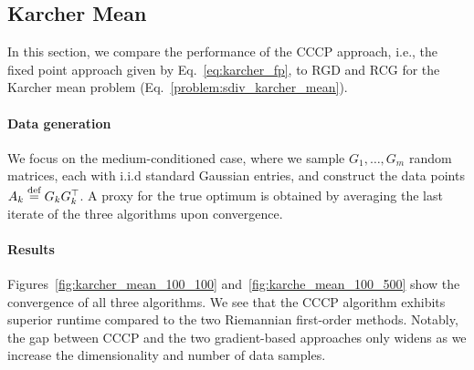 \documentclass[sn-nature]{sn-jnl}%
\theoremstyle{thmstyleone}%
\theoremstyle{thmstyletwo}%
\theoremstyle{thmstylethree}%
\begin{document}
\subsection{Karcher Mean}
In this section, we compare the performance of the CCCP approach, i.e., the fixed point approach given by Eq.~\ref{eq:karcher_fp}, to RGD and RCG for the Karcher mean problem (Eq.~\ref{problem:sdiv_karcher_mean}).


\paragraph{Data generation} 
We focus on the medium-conditioned case, where we sample $G_{1}, \ldots, G_m $ random matrices, each with i.i.d standard Gaussian entries, and construct the data points $A_k \stackrel{\text{def}}{=} G_kG_k^\top$. A proxy for the true optimum is obtained by averaging the last iterate of the three algorithms upon convergence.


\paragraph{Results}
Figures~\ref{fig:karcher_mean_100_100} and~\ref{fig:karche_mean_100_500} show the convergence of all three algorithms.
We see that the CCCP algorithm exhibits superior runtime  compared to the two Riemannian first-order methods. Notably, the gap between CCCP and the two gradient-based approaches only widens as we increase the dimensionality and number of data samples.
\end{document}
